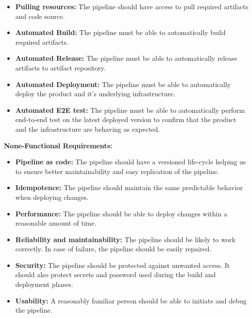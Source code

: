 \begin{itemize}[label=\textbullet]

\item \textbf{Pulling resources:} The pipeline should have access to pull required artifacts and code source.

\item \textbf{Automated Build:} The pipeline must be able to automatically build required artifacts.

\item \textbf{Automated Release:} The pipeline must be able to automatically release artifacts to artifact repository.

\item \textbf{Automated Deployment:} The pipeline must be able to automatically deploy the product and it's underlying infrastructure. 

\item \textbf{Automated E2E test:} The pipeline must be able to automatically perform end-to-end test on the latest deployed version to confirm that the product and the infrastructure are behaving as expected. 

\end{itemize}

\textbf{None-Functional Requirements:} 

\begin{itemize}[label=\textbullet]

\item \textbf{Pipeline as code:} The pipeline should have a versioned life-cycle helping us to ensure better maintainability and easy replication of the pipeline.  

\item \textbf{Idempotence:} The pipeline should maintain the same predictable behavior when deploying changes.

\item \textbf{Performance:} The pipeline should be able to deploy changes within a reasonable amount of time.
\item \textbf{Reliability and maintainability:} The pipeline should be likely to work correctly. In case of failure, the pipeline should be easily repaired.  

\item \textbf{Security:} The pipeline should be protected against unwanted access. It should also protect secrets and password used during the build and deployment phases. 

\item \textbf{Usability:} A reasonably familiar person should be able to initiate and debug the pipeline.
\end{itemize}

